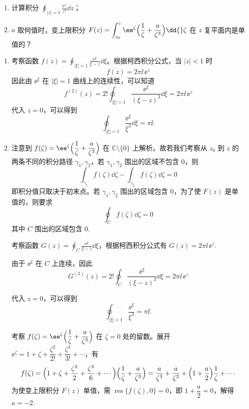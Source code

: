 \begin{question}
\begin{enumerate}
  \item 计算积分 \(\displaystyle \oint_{|z|=1} \frac{\ee^{z}}{z^3}\dd{z}\)；

  \item \(a\) 取何值时，变上限积分 \(\displaystyle F(z)=\int_{z_0}^{z} \ee^{\zeta}\Bigl(\frac1\zeta+\frac{a}{\zeta^3}\Bigr)\dd{}\zeta\) 在 \(z\) 复平面内是单值的？

\end{enumerate}
\begin{solution}
\begin{enumerate}
  \item 考察函数 \(f(z)=\displaystyle\oint_{|\xi|=1} \frac{\ee^{\xi}}{\xi-z}\dd{\xi}\)。根据柯西积分公式，当 \(|z|<1\) 时
\[ f(z)=2\pi\ii\,\ee^{z} \]
因此由 \(\ee^{\xi}\) 在 \(|\xi|=1\) 曲线上的连续性，可以知道
\[ f^{(2)}(z)=2! \oint_{|\xi|=1} \frac{\ee^{\xi}}{(\xi-z)^3}\dd{}\xi = 2\pi\ii\,\ee^{z} \]
代入 \(z=0\)，可以得到
\[ \oint_{|\xi|=1} \frac{\ee^{\xi}}{\xi^3}\dd{\xi} = \pi\ii.  \]

  \item 注意到 \(f(\zeta)=\ee^{\zeta}\Bigl(\dfrac1\zeta+\dfrac{a}{\zeta^3}\Bigr)\) 在 \(\mathbb{C}\setminus\{0\}\) 上解析。故若我们考察从 \(z_0\) 到 \(z\) 的两条不同的积分路径 \(\gamma_1,\gamma_2\)，若 \(\gamma_1,\gamma_2\) 围出的区域不包含 \(0\)，则
\[ \int_{\gamma_1} f(\zeta)\dd{}\zeta-\int_{\gamma_2} f(\zeta)\dd{}\zeta = 0 \]
即积分值只取决于初末点。若 \(\gamma_1,\gamma_2\) 围出的区域包含 \(0\)，为了使 \(F(z)\) 是单值的，则要求
\[ \oint_C f(\zeta)\dd{}\zeta = 0 \]
其中 \(C\) 围出的区域包含 \(0\).

考察函数 \(G(z)=\displaystyle\oint_C \frac{\ee^{\xi}}{\xi-z}\dd{}\xi\)，根据柯西积分公式有 \(G(z)=2\pi\ii\,\ee^{z}\).

由于 \(\ee^{\xi}\) 在 \(C\) 上连续，因此
\[ G^{(2)}(z)=2! \oint_C \frac{\ee^{\xi}}{(\xi-z)^3}\dd{}\xi = 2\pi\ii\,\ee^{z} \]

代入 \(z=0\)，可以得到
\[ \oint_{|\xi|=1} \frac{\ee^{\xi}}{\xi^3} = \pi\ii. \]

考察 \(f(\zeta)=\ee^{\zeta}\Bigl(\dfrac1\zeta+\dfrac{a}{\zeta^3}\Bigr)\) 在 \(\zeta=0\) 处的留数。展开 \(\ee^{\zeta}=1+\zeta+\dfrac{\zeta^2}{2!}+\dfrac{\zeta^3}{3!}+\cdots\)，有
\[
f(\zeta)=\Bigl(1+\zeta+\frac{\zeta^2}{2}+\frac{\zeta^3}{6}+\cdots\Bigr)\Bigl(\frac1\zeta+\frac{a}{\zeta^3}\Bigr)
=\frac{a}{\zeta^3}+\frac{a}{\zeta^2}+\Bigl(1+\frac{a}{2}\Bigr)\frac1\zeta+\cdots
\]
为使变上限积分 \(F(z)\) 单值，需 \(\operatorname{res}\{f(\zeta),0\}=0\)，即 \(1+\dfrac{a}{2}=0\)，解得 \(a=-2\).
\end{enumerate}
\end{solution}
\end{question}
